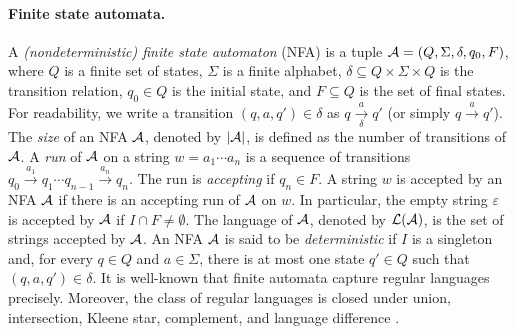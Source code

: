 \paragraph*{Finite state automata.} 
A \emph{(nondeterministic) finite state automaton} (NFA)  is a tuple $\mathcal{A}=(Q, \Sigma, \delta, q_0, F)$, where $Q$ is a finite set of states, $\Sigma$ is a finite alphabet, $\delta \subseteq Q \times \Sigma \times Q$ is the transition relation, $q_0 \in Q$ is the initial state, and $F \subseteq Q$ is the set of final states. For readability, we write a transition $(q, a, q') \in \delta$ as $q \xrightarrow[\delta]{a} q'$ (or simply $q \xrightarrow{a} q'$). %
The \emph{size} of an NFA $\mathcal{A}$, denoted by $|\mathcal{A}|$, is defined as the number of transitions of $\mathcal{A}$.
%
A \emph{run} of $\mathcal{A}$ on a string $w = a_1 \cdots a_n$ is a sequence of transitions $q_0 \xrightarrow{a_1} q_1 \cdots q_{n-1} \xrightarrow{a_n} q_n$. The run is \emph{accepting} if $q_n \in F$.
A string $w$ is accepted by an NFA $\mathcal{A}$ if there is an accepting run of $\mathcal{A}$ on $w$. In particular, the empty string $\varepsilon$ is accepted by $\mathcal{A}$ if $I \cap F \neq \emptyset$. The language of $\mathcal{A}$, denoted by $\mathcal{L}(\mathcal{A})$, is the set of strings accepted by $\mathcal{A}$. 
%
An NFA $\mathcal{A}$ is said to be \emph{deterministic} if $I$ is a singleton and, for every $q \in Q$ and $a \in \Sigma$, there is at most one state $q' \in Q$ such that $(q, a, q') \in \delta$.
%
It is well-known that finite automata capture regular languages precisely. Moreover, the class of regular languages is closed under union, intersection, Kleene star, complement, and language difference \cite{HU79}.  





